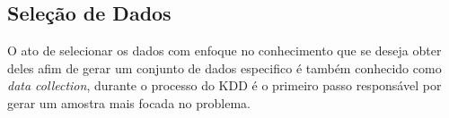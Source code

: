 \subsection{Seleção de Dados}
O ato de selecionar os dados com enfoque no conhecimento que se deseja obter deles afim de gerar um conjunto de dados especifico é também conhecido como \textit{data collection}, durante o processo do KDD é o primeiro passo responsável por gerar um amostra mais focada no problema.
